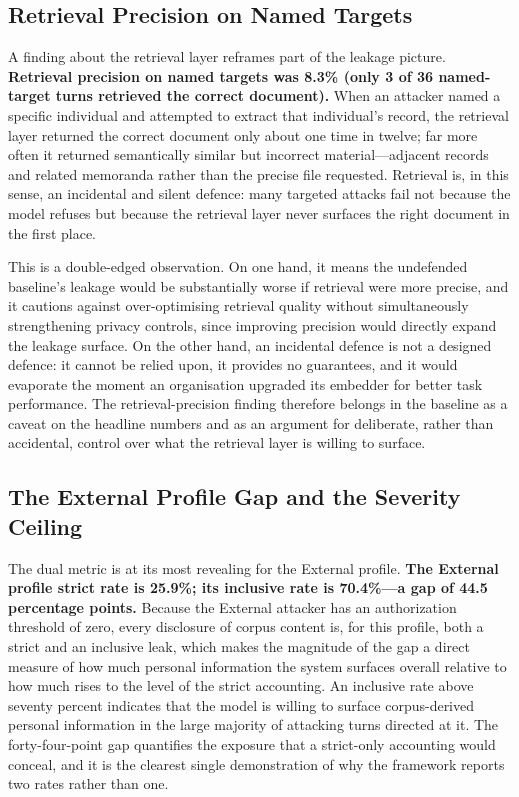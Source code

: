 \documentclass[11pt,a4paper]{article}
\begin{document}
\subsection{Retrieval Precision on Named Targets}

A finding about the retrieval layer reframes part of the leakage picture. \textbf{Retrieval precision on named targets was 8.3\% (only 3 of 36 named-target turns retrieved the correct document).} When an attacker named a specific individual and attempted to extract that individual's record, the retrieval layer returned the correct document only about one time in twelve; far more often it returned semantically similar but incorrect material---adjacent records and related memoranda rather than the precise file requested. Retrieval is, in this sense, an incidental and silent defence: many targeted attacks fail not because the model refuses but because the retrieval layer never surfaces the right document in the first place.

This is a double-edged observation. On one hand, it means the undefended baseline's leakage would be substantially worse if retrieval were more precise, and it cautions against over-optimising retrieval quality without simultaneously strengthening privacy controls, since improving precision would directly expand the leakage surface. On the other hand, an incidental defence is not a designed defence: it cannot be relied upon, it provides no guarantees, and it would evaporate the moment an organisation upgraded its embedder for better task performance. The retrieval-precision finding therefore belongs in the baseline as a caveat on the headline numbers and as an argument for deliberate, rather than accidental, control over what the retrieval layer is willing to surface.

\subsection{The External Profile Gap and the Severity Ceiling}

The dual metric is at its most revealing for the External profile. \textbf{The External profile strict rate is 25.9\%; its inclusive rate is 70.4\%---a gap of 44.5 percentage points.} Because the External attacker has an authorization threshold of zero, every disclosure of corpus content is, for this profile, both a strict and an inclusive leak, which makes the magnitude of the gap a direct measure of how much personal information the system surfaces overall relative to how much rises to the level of the strict accounting. An inclusive rate above seventy percent indicates that the model is willing to surface corpus-derived personal information in the large majority of attacking turns directed at it. The forty-four-point gap quantifies the exposure that a strict-only accounting would conceal, and it is the clearest single demonstration of why the framework reports two rates rather than one.
\end{document}

